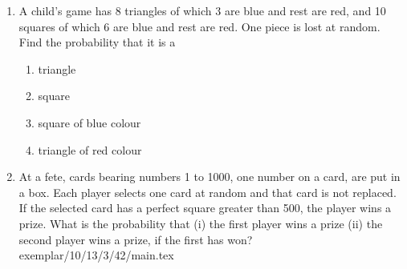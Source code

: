 \begin{enumerate}
\item A child's game has 8 triangles of which 3 are blue and rest are red, and 10 squares of which 6 are blue and rest are red. One piece is lost at random. Find the probability that it is a
\renewcommand{\labelenumi}{(\roman{enumi})}
\begin{enumerate}
\item triangle 
\item square 
\item square of blue colour 
\item triangle of red colour           
\end{enumerate}
\solution

\item At a fete, cards bearing numbers 1 to 1000, one number
on a card, are put in a box. Each player selects one card
at random and that card is not replaced. If the selected
card has a perfect square greater than 500, the player
wins a prize. What is the probability that
(i) the first player wins a prize
(ii) the second player wins a prize, if the first has won? 
\solution
 {exemplar/10/13/3/42/main.tex}
\end{enumerate}
